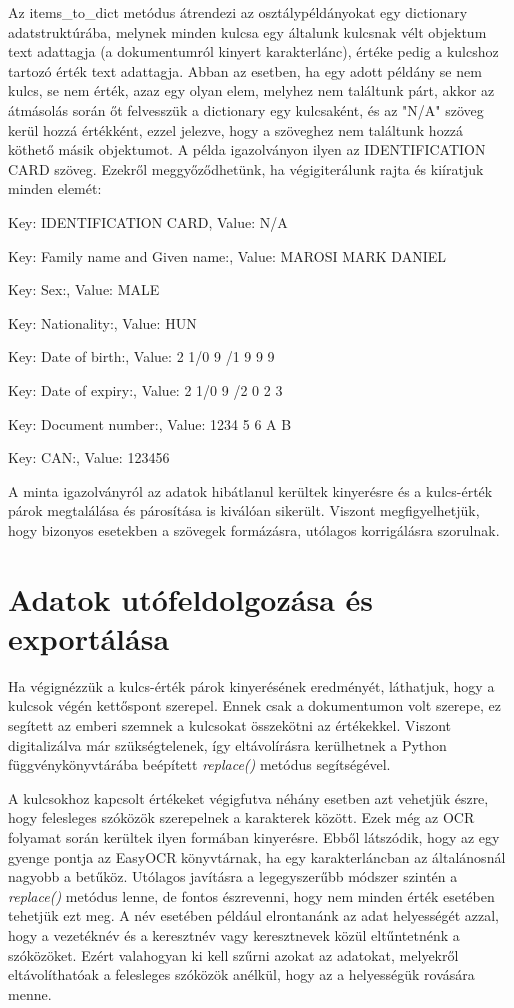 \documentclass[12pt]{report}
\begin{document}
Az items\_to\_dict metódus átrendezi az osztálypéldányokat egy dictionary adatstruktúrába, melynek minden kulcsa egy általunk kulcsnak vélt objektum text adattagja (a dokumentumról kinyert karakterlánc), értéke pedig a kulcshoz tartozó érték text adattagja. Abban az esetben, ha egy adott példány se nem kulcs, se nem érték, azaz egy olyan elem, melyhez nem találtunk párt, akkor az átmásolás során őt felvesszük a dictionary egy kulcsaként, és az "N/A" szöveg kerül hozzá értékként, ezzel jelezve, hogy a szöveghez nem találtunk hozzá köthető másik objektumot. A példa igazolványon ilyen az IDENTIFICATION CARD szöveg.
Ezekről meggyőződhetünk, ha végigiterálunk rajta és kiíratjuk minden elemét:

\begin{tcolorbox}
    Key: IDENTIFICATION CARD, Value: N/A

    Key: Family name and Given name:, Value: MAROSI MARK DANIEL

    Key: Sex:, Value: MALE

    Key: Nationality:, Value: HUN

    Key: Date of birth:, Value: 2 1/0 9 /1 9 9 9

    Key: Date of expiry:, Value: 2 1/0 9 /2 0 2 3

    Key: Document number:, Value: 1234 5 6 A B

    Key: CAN:, Value: 123456
\end{tcolorbox}

A minta igazolványról az adatok hibátlanul kerültek kinyerésre és a kulcs-érték párok megtalálása és párosítása is kiválóan sikerült. Viszont megfigyelhetjük, hogy bizonyos esetekben a szövegek formázásra, utólagos korrigálásra szorulnak.

\section{Adatok utófeldolgozása és exportálása}

Ha végignézzük a kulcs-érték párok kinyerésének eredményét, láthatjuk, hogy a kulcsok végén kettőspont szerepel. Ennek csak a dokumentumon volt szerepe, ez segített az emberi szemnek a kulcsokat összekötni az értékekkel. Viszont digitalizálva már szükségtelenek, így eltávolírásra kerülhetnek a Python függvénykönyvtárába beépített \emph{replace()} metódus segítségével.

A kulcsokhoz kapcsolt értékeket végigfutva néhány esetben azt vehetjük észre, hogy felesleges szóközök szerepelnek a karakterek között. Ezek még az OCR folyamat során kerültek ilyen formában kinyerésre. Ebből látszódik, hogy az egy gyenge pontja az EasyOCR könyvtárnak, ha egy karakterláncban az általánosnál nagyobb a betűköz. Utólagos javításra a legegyszerűbb módszer szintén a \emph{replace()} metódus lenne, de fontos észrevenni, hogy nem minden érték esetében tehetjük ezt meg. A név esetében például elrontanánk az adat helyességét azzal, hogy a vezetéknév és a keresztnév vagy keresztnevek közül eltűntetnénk a szóközöket. 
Ezért valahogyan ki kell szűrni azokat az adatokat, melyekről eltávolíthatóak a felesleges szóközök anélkül, hogy az a helyességük rovására menne.
\end{document}
